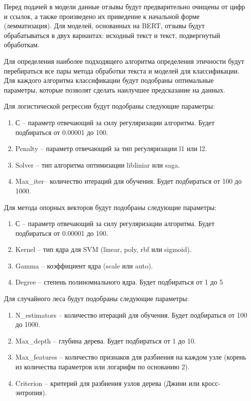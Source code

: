 \documentclass[PI, VKR]{HSEUniversity}
\begin{document}
Перед подачей в модели данные отзывы будут предварительно очищены от цифр и ссылок, а также произведено их приведение к начальной форме (лемматизация). Для моделей, основанных на BERT, отзывы будут обрабатываться в двух вариантах: исходный текст и текст, подвергнутый обработкам.

Для определения наиболее подходящего алгоритма определения этичности будут перебираться все пары метода обработки текста и моделей для классификации. Для каждого алгоритма классификации будут подобраны оптимальные параметры, которые позволят сделать наилучшее предсказание на данных.

Для логистической регрессии будут подобраны следующие параметры:
\begin{enumerate}
\item С -- параметр отвечающий за силу регуляризации алгоритма. Будет подбираться от 0.00001 до 100.
\item Penalty -- параметр отвечающий за тип регуляризации l1 или l2.
\item Solver -- тип алгоритма оптимизации libliniar\autocite{fan_liblinear_2008} или saga\autocite{defazio_saga_2014}.
\item Max\_iter-- количество итераций для обучения. Будет подбираться от 100 до 1000.
\end{enumerate}

Для метода опорных векторов будут подобраны следующие параметры:
\begin{enumerate}
\item С -- параметр отвечающий за силу регуляризации алгоритма. Будет подбираться от 0.00001 до 100.
\item Kernel -- тип ядра для SVM (linear, poly, rbf или sigmoid).
\item Gamma -- коэффициент ядра (scale или auto).
\item Degree -- степень полиномиального ядра. Будет подбираться от 1 до 5
\end{enumerate}

Для случайного леса будут подобраны следующие параметры:
\begin{enumerate}
\item N\_estimators -- количество итераций для обучения. Будет подбираться от 100 до 1000.
\item Max\_depth -- глубина дерева. Будет подбираться от 1 до 10.
\item Max\_features -- количество признаков для разбиения на каждом узле (корень из количества параметров или логарифм по основанию 2).
\item Criterion -- критерий для разбиения узлов дерева (Джини или кросс-энтропия).
\end{enumerate}
\end{document}
